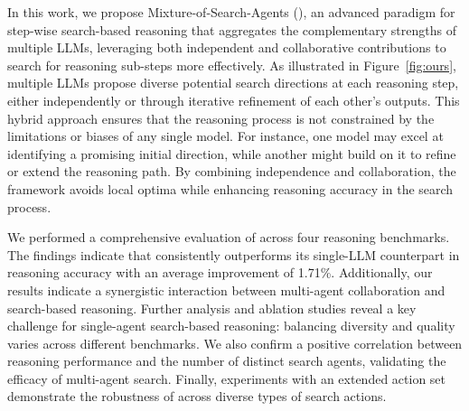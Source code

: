 In this work, we propose Mixture-of-Search-Agents (\mosa{}), an advanced paradigm for step-wise search-based reasoning that aggregates the complementary strengths of multiple LLMs, leveraging both independent and collaborative contributions to search for reasoning sub-steps more effectively. 
As illustrated in Figure~\ref{fig:ours}, multiple LLMs propose diverse potential search directions at each reasoning step, either independently or through iterative refinement of each other's outputs.
This hybrid approach ensures that the reasoning process is not constrained by the limitations or biases of any single model. 
For instance, one model may excel at identifying a promising initial direction, while another might build on it to refine or extend the reasoning path. 
By combining independence and collaboration, the framework avoids local optima while enhancing reasoning accuracy in the search process.


We performed a comprehensive evaluation of \ourmethod{} across four reasoning benchmarks.
The findings indicate that \ourmethod{} consistently outperforms its single-LLM counterpart in reasoning accuracy with an average improvement of 1.71\%.
Additionally, our results indicate a synergistic interaction between multi-agent collaboration and search-based reasoning.
Further analysis and ablation studies reveal a key challenge for single-agent search-based reasoning: balancing diversity and quality varies across different benchmarks.
We also confirm a positive correlation between reasoning performance and the number of distinct search agents, validating the efficacy of multi-agent search.
Finally, experiments with an extended action set demonstrate the robustness of \ourmethod{} across diverse types of search actions.
